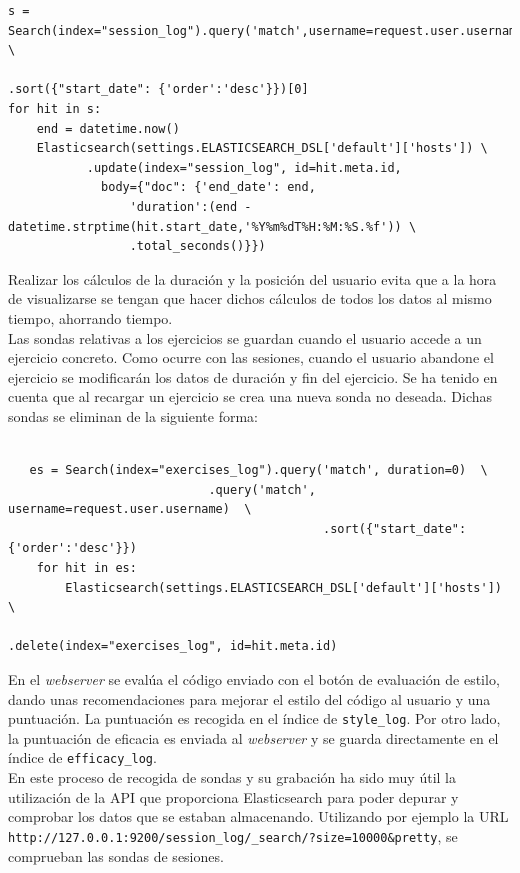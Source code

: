 \begin{lstlisting}
s = Search(index="session_log").query('match',username=request.user.username) \
        														.sort({"start_date": {'order':'desc'}})[0]
for hit in s:
    end = datetime.now()
    Elasticsearch(settings.ELASTICSEARCH_DSL['default']['hosts']) \
           .update(index="session_log", id=hit.meta.id,
             body={"doc": {'end_date': end,
                 'duration':(end - datetime.strptime(hit.start_date,'%Y%m%dT%H:%M:%S.%f')) \ 
                 .total_seconds()}})
\end{lstlisting}

Realizar los cálculos de la duración y la posición del usuario evita que a la hora de visualizarse se tengan que hacer dichos cálculos de todos los datos al mismo tiempo, ahorrando tiempo.\\
\newpage
Las sondas relativas a los ejercicios se guardan cuando el usuario accede a un ejercicio concreto. Como ocurre con las sesiones, cuando el usuario abandone el ejercicio se modificarán los datos de duración y fin del ejercicio. Se ha tenido en cuenta que al recargar un ejercicio se crea una nueva sonda no deseada. Dichas sondas se eliminan de la siguiente forma:\\
\\
\begin{lstlisting}
   es = Search(index="exercises_log").query('match', duration=0)  \
   				            .query('match', username=request.user.username)  \
        					                .sort({"start_date": {'order':'desc'}})
    for hit in es:
        Elasticsearch(settings.ELASTICSEARCH_DSL['default']['hosts'])  \ 
    				                        .delete(index="exercises_log", id=hit.meta.id)
\end{lstlisting}

En el \textit{webserver} se evalúa el código enviado con el botón de evaluación de estilo, dando unas recomendaciones para mejorar el estilo del código al usuario y una puntuación. La puntuación es recogida en el índice de \texttt{style\_log}. Por otro lado, la puntuación de eficacia es enviada al \textit{webserver} y se guarda directamente en el índice de \texttt{efficacy\_log}. \\

En este proceso de recogida de sondas y su grabación ha sido muy útil la utilización de la API que proporciona Elasticsearch para poder depurar y comprobar los datos que se estaban almacenando. Utilizando por ejemplo la URL    \newline       \texttt{http://127.0.0.1:9200/session\_log/\_search/?size=10000&pretty}, se comprueban las sondas de sesiones.\\
